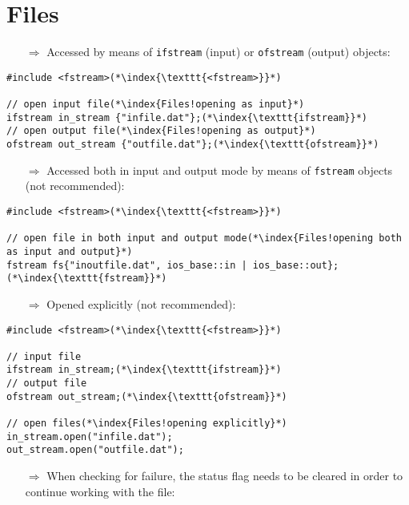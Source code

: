 \documentclass[10pt]{article}
\begin{document}
\section{Files}
\small
\begin{enumerate}
\item[$\Rightarrow$] Accessed by means of \texttt{ifstream} (input) or \texttt{ofstream} (output) objects:
\end{enumerate}
\begin{lstlisting}
#include <fstream>(*\index{\texttt{<fstream>}}*)

// open input file(*\index{Files!opening as input}*)
ifstream in_stream {"infile.dat"};(*\index{\texttt{ifstream}}*)
// open output file(*\index{Files!opening as output}*)
ofstream out_stream {"outfile.dat"};(*\index{\texttt{ofstream}}*)
\end{lstlisting}
\begin{enumerate}
\item[$\Rightarrow$] Accessed both in input and output mode by means of \texttt{fstream} objects (not recommended):
\end{enumerate}
\begin{lstlisting}
#include <fstream>(*\index{\texttt{<fstream>}}*)

// open file in both input and output mode(*\index{Files!opening both as input and output}*)
fstream fs{"inoutfile.dat", ios_base::in | ios_base::out};(*\index{\texttt{fstream}}*)
\end{lstlisting}
\begin{enumerate}
\item[$\Rightarrow$] Opened explicitly (not recommended):
\end{enumerate}
\begin{lstlisting}
#include <fstream>(*\index{\texttt{<fstream>}}*)

// input file 
ifstream in_stream;(*\index{\texttt{ifstream}}*)
// output file
ofstream out_stream;(*\index{\texttt{ofstream}}*)

// open files(*\index{Files!opening explicitly}*)
in_stream.open("infile.dat");
out_stream.open("outfile.dat");
\end{lstlisting}
\begin{enumerate}
\item[$\Rightarrow$] When checking for failure, the status flag needs to be cleared in order to continue working with the file:
\end{enumerate}
\end{document}
